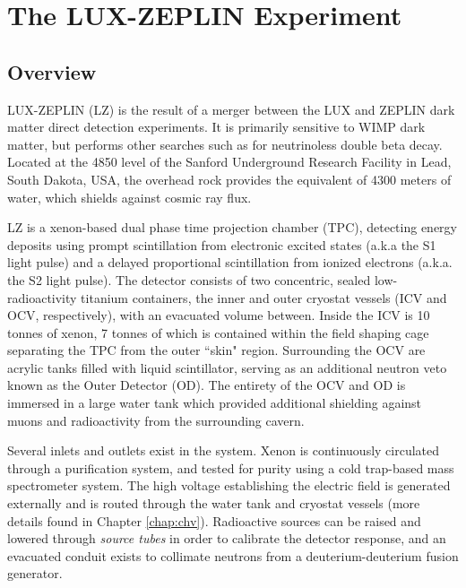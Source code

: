 \chapter{The LUX-ZEPLIN Experiment}
\label{chap:lz}
\section{Overview}

LUX-ZEPLIN (LZ) is the result of a merger between the LUX\cite{the_lux_collaboration_improved_2020} and ZEPLIN\cite{akimov_zeplin-iii_2007} dark matter direct detection experiments.
It is primarily sensitive to WIMP dark matter, but performs other searches such as for neutrinoless double beta decay.
Located at the 4850 level of the Sanford Underground Research Facility in Lead, South Dakota, USA, the overhead rock provides the equivalent of 4300 meters of water\cite{mount_lux-zeplin_2017}, which shields against cosmic ray flux.

LZ is a xenon-based dual phase time projection chamber (TPC), detecting energy deposits using prompt scintillation from electronic excited states (a.k.a the S1 light pulse) and a delayed proportional scintillation from ionized electrons (a.k.a. the S2 light pulse).
The detector consists of two concentric, sealed low-radioactivity titanium containers, the inner and outer cryostat vessels (ICV and OCV, respectively), with an evacuated volume between.
Inside the ICV is 10 tonnes of xenon, 7 tonnes of which is contained within the field shaping cage separating the TPC from the outer ``skin" region\cite{akerib_lux-zeplin_2020}.
Surrounding the OCV are acrylic tanks filled with liquid scintillator, serving as an additional neutron veto known as the Outer Detector (OD).
The entirety of the OCV and OD is immersed in a large water tank which provided additional shielding against muons and radioactivity from the surrounding cavern.

Several inlets and outlets exist in the system.
Xenon is continuously circulated through a purification system, and tested for purity using a cold trap-based mass spectrometer system\cite{akerib_lux-zeplin_2020}.
The high voltage establishing the electric field is generated externally and is routed through the water tank and cryostat vessels (more details found in Chapter \ref{chap:chv}).
Radioactive sources can be raised and lowered through \textit{source tubes} in order to calibrate the detector response, and an evacuated conduit exists to collimate neutrons from a deuterium-deuterium fusion generator.

